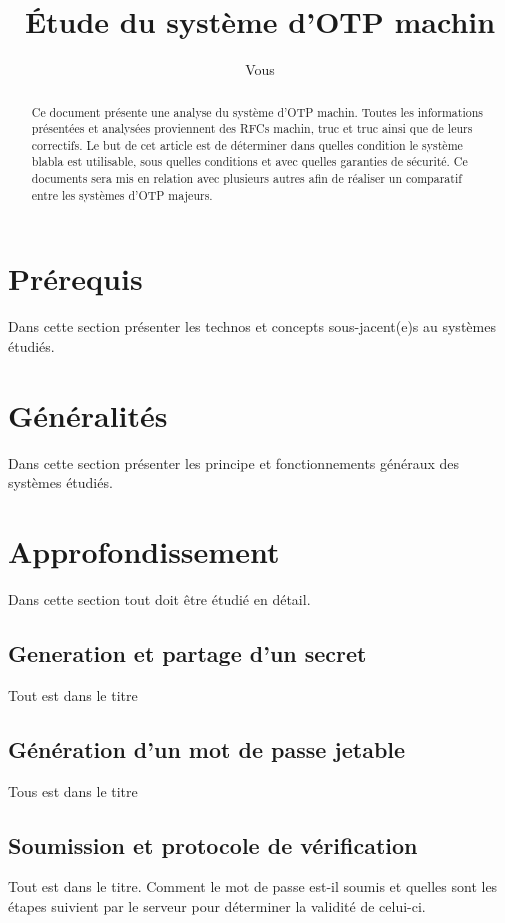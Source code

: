 \documentclass{../res/univ-projet}
\title{\'Etude du syst\`eme d'OTP machin}
\author{Vous}
\begin{document}
\maketitle

\begin{abstract}
Ce document présente une analyse du système d'OTP machin. Toutes les informations présentées et analysées proviennent des RFCs machin, truc et truc ainsi que de leurs 
correctifs. Le but de cet article est de déterminer dans quelles condition le système blabla est utilisable, sous quelles conditions et avec quelles garanties de sécurité.
Ce documents sera mis en relation avec plusieurs autres afin de réaliser un comparatif entre les systèmes d'OTP majeurs.
\end{abstract}
\newpage
\tableofcontents
\newpage

\section{Prérequis}
Dans cette section présenter les technos et concepts sous-jacent(e)s au systèmes étudiés.

\section{Généralités}
Dans cette section présenter les principe et fonctionnements généraux des systèmes étudiés.

\section{Approfondissement}
  Dans cette section tout doit \^etre étudié en détail.
  \subsection{Generation et partage d'un secret}
  Tout est dans le titre
  
  \subsection{Génération d'un mot de passe jetable}
  Tous est dans le titre
  
  \subsection{Soumission et protocole de vérification}
  Tout est dans le titre. Comment le mot de passe est-il soumis et quelles sont les étapes suivient par le serveur pour déterminer la validité de celui-ci.
  
\end{document}
